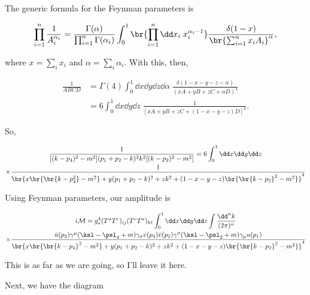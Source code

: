 The generic formula for the Feynman parameters is

\begin{equation}
  \prod_{i=1}^n \frac{1}{A_i^{\alpha_i}} = \frac{\Gamma(\alpha)}{\prod_{i=1}^n \Gamma(\alpha_i)} \int_0^1 \br{\prod_{i=1}^n \dd x_i \;  x_i^{\alpha_i - 1}} \frac{\delta(1-x)}{\br{\sum_{i=1}^n x_iA_i}^\alpha},
\end{equation}

where $x = \sum_i x_i$ and $\alpha = \sum_i \alpha_i$. With this, then,

\begin{align}
  \frac{1}{ABCD} &= \Gamma(4) \int_0^1 \dd x \dd y \dd z \dd \alpha \; \frac{\delta(1-x-y-z-\alpha)}{(xA + yB + zC + \alpha D)^4} \\
                 &= 6\int_0^1 \dd x \dd y \dd z \; \frac{1}{[xA + yB + zC + (1-x-y-z)D]^4}.
\end{align}

So,

\begin{multline}
  \frac{1}{[(k - p_4)^2 - m^2](p_1 + p_2 - k)^2k^2[(k - p_2)^2 - m^2]} = 6\int_0^1 \dd x \dd y \dd z \\
  \times \frac{1}{\br{x\br{\br{k - p_4^2} - m^2} + y(p_1 + p_2 - k)^2 + zk^2 + (1-x-y-z)\br{\br{k - p_2}^2 - m^2}}^4 }
\end{multline}

Using Feynman parameters, our amplitude is

\begin{multline}
  i\mathcal{M} = g_s^4 (T^aT^c)_{ij}(T^cT^a)_{k\ell} \int_0^1 \dd x \dd y \dd z \int \frac{\dd^nk}{(2\pi)^n} \\
  \times \frac{\bar{u}(p_3)\gamma^\mu(\ksl - \psl_4 + m)\gamma_\sigma v(p_4) \bar{v}(p_2) \gamma^\sigma (\ksl - \psl_2 + m) \gamma_\mu u(p_1)}{\br{x\br{\br{k - p_4}^2 - m^2} + y(p_1 + p_2 - k)^2 + zk^2 + (1-x-y-z)\br{\br{k - p_2}^2 - m^2}}^4 }
\end{multline}

This is as far as we are going, so I'll leave it here.

Next, we have the diagram

\begin{center}
\end{center}

